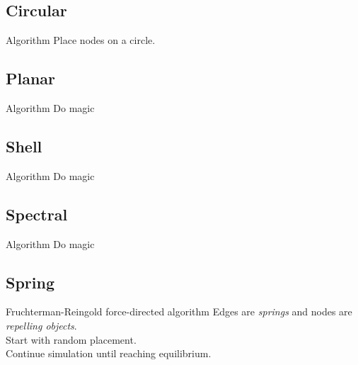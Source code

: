 \documentclass[11pt]{beamer}
\begin{document}
\subsection{Circular}
\begin{frame}{\subsecname}
    \begin{block}{Algorithm}
        Place nodes on a circle.
    \end{block}

    \pause
    \resizebox{0.8\textwidth}{!}{}
\end{frame}

\subsection{Planar}
\begin{frame}{\subsecname}
    \begin{block}{Algorithm}
        Do magic
    \end{block}

    \pause
    \resizebox{0.8\textwidth}{!}{}
\end{frame}

\subsection{Shell}
\begin{frame}{\subsecname}
    \begin{block}{Algorithm}
        Do magic
    \end{block}

    \pause
    \resizebox{0.8\textwidth}{!}{}
\end{frame}

\subsection{Spectral}
\begin{frame}{\subsecname}
    \begin{block}{Algorithm}
        Do magic
    \end{block}

    \pause
    \resizebox{0.8\textwidth}{!}{}
\end{frame}

\subsection{Spring}
\begin{frame}{\subsecname}

    \begin{block}{Fruchterman-Reingold force-directed algorithm}
        Edges are \textit{springs} and nodes are \textit{repelling objects}.\\
        Start with random placement.\\
        Continue simulation until reaching equilibrium.
    \end{block}

\end{frame}
\end{document}
